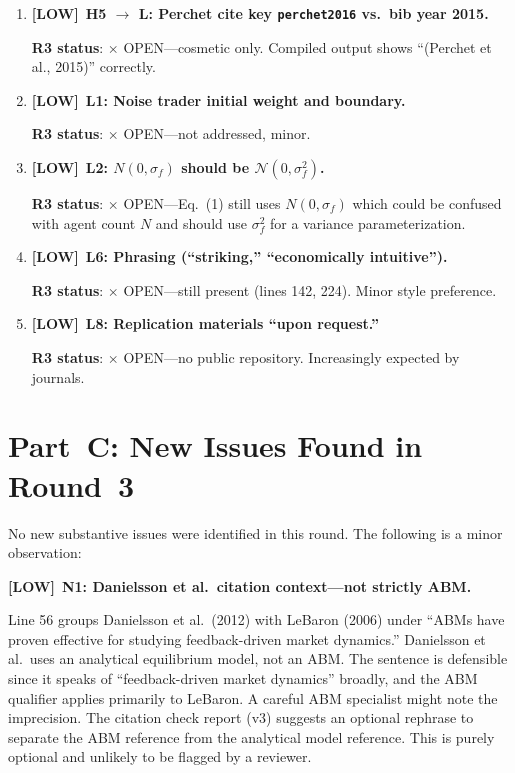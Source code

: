 \documentclass[12pt,a4paper]{article}
\newcommand{\LOW}{\textbf{\textcolor{okgreen}{[LOW]}}}
\newcommand{\OPEN}{\textcolor{errorred}{$\times$ OPEN}}
\begin{document}
\begin{enumerate}

\item \LOW\ \textbf{H5 $\to$ L: Perchet cite key \texttt{perchet2016} vs.\ bib year 2015.}

\textbf{R3 status}: \OPEN---cosmetic only. Compiled output shows ``(Perchet et al., 2015)'' correctly.

\item \LOW\ \textbf{L1: Noise trader initial weight and boundary.}

\textbf{R3 status}: \OPEN---not addressed, minor.

\item \LOW\ \textbf{L2: $N(0,\sigma_f)$ should be $\mathcal{N}(0,\sigma_f^2)$.}

\textbf{R3 status}: \OPEN---Eq.~(1) still uses $N(0, \sigma_f)$ which could be confused with agent count $N$ and should use $\sigma_f^2$ for a variance parameterization.

\item \LOW\ \textbf{L6: Phrasing (``striking,'' ``economically intuitive'').}

\textbf{R3 status}: \OPEN---still present (lines 142, 224). Minor style preference.

\item \LOW\ \textbf{L8: Replication materials ``upon request.''}

\textbf{R3 status}: \OPEN---no public repository. Increasingly expected by journals.

\end{enumerate}


\section*{Part~C: New Issues Found in Round~3}

No new substantive issues were identified in this round. The following is a minor observation:

\LOW\ \textbf{N1: Danielsson et al.\ citation context---not strictly ABM.}

Line 56 groups Danielsson et al.\ (2012) with LeBaron (2006) under ``ABMs have proven effective for studying feedback-driven market dynamics.'' Danielsson et al.\ uses an analytical equilibrium model, not an ABM. The sentence is defensible since it speaks of ``feedback-driven market dynamics'' broadly, and the ABM qualifier applies primarily to LeBaron. A careful ABM specialist might note the imprecision. The citation check report (v3) suggests an optional rephrase to separate the ABM reference from the analytical model reference. This is purely optional and unlikely to be flagged by a reviewer.
\end{document}
